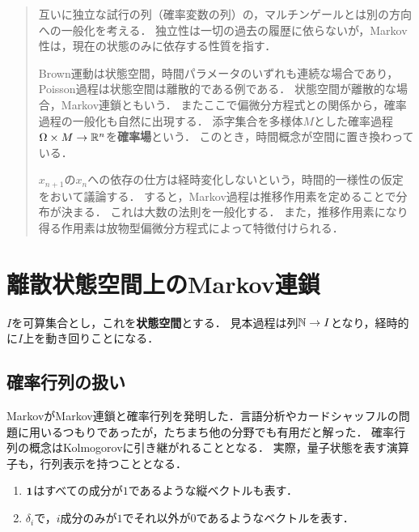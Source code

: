 \documentclass[uplatex,dvipdfmx]{jsreport}
\begin{document}
\begin{quotation}
    互いに独立な試行の列（確率変数の列）の，マルチンゲールとは別の方向への一般化を考える．
    独立性は一切の過去の履歴に依らないが，Markov性は，現在の状態のみに依存する性質を指す．

    Brown運動は状態空間，時間パラメータのいずれも連続な場合であり，Poisson過程は状態空間は離散的である例である．
    状態空間が離散的な場合，Markov連鎖ともいう．
    またここで偏微分方程式との関係から，確率過程の一般化も自然に出現する．
    添字集合を多様体$M$とした確率過程$\Omega\times M\to\mathbb{R}^n$を\textbf{確率場}という．
    このとき，時間概念が空間に置き換わっている．

    $x_{n+1}$の$x_n$への依存の仕方は経時変化しないという，時間的一様性の仮定をおいて議論する．
    すると，Markov過程は推移作用素を定めることで分布が決まる．
    これは大数の法則を一般化する．
    また，推移作用素になり得る作用素は放物型偏微分方程式によって特徴付けられる．
\end{quotation}

\section{離散状態空間上のMarkov連鎖}

\begin{notation}
    $I$を可算集合とし，これを\textbf{状態空間}とする．
    見本過程は列$\mathbb{N}\to I$となり，経時的に$I$上を動き回りことになる．
\end{notation}

\subsection{確率行列の扱い}

\begin{history}
    MarkovがMarkov連鎖と確率行列を発明した．言語分析やカードシャッフルの問題に用いるつもりであったが，たちまち他の分野でも有用だと解った．
    確率行列の概念はKolmogorovに引き継がれることとなる．
    実際，量子状態を表す演算子も，行列表示を持つこととなる．
\end{history}

\begin{notation}\mbox{}
    \begin{enumerate}
        \item $\mathbf{1}$はすべての成分が$1$であるような縦ベクトルも表す．
        \item $\delta_i$で，$i$成分のみが$1$でそれ以外が$0$であるようなベクトルを表す．
    \end{enumerate}
\end{notation}
\end{document}
